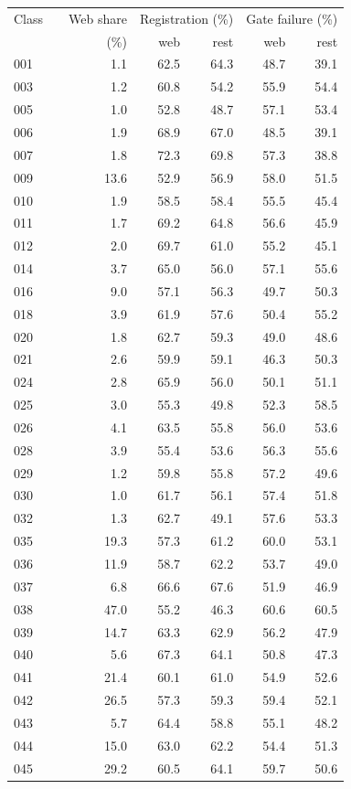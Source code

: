 \begin{tabular}{llrrrrr}
\toprule
Class & & Web share & \multicolumn{2}{c}{Registration (\%)} & \multicolumn{2}{c}{Gate failure (\%)} \\
 & & (\%) & web & rest & web & rest \\
\midrule
001 &  & 1.1 & 62.5 & 64.3 & 48.7 & 39.1 \\
003 &  & 1.2 & 60.8 & 54.2 & 55.9 & 54.4 \\
005 &  & 1.0 & 52.8 & 48.7 & 57.1 & 53.4 \\
006 &  & 1.9 & 68.9 & 67.0 & 48.5 & 39.1 \\
007 &  & 1.8 & 72.3 & 69.8 & 57.3 & 38.8 \\
009 &  & 13.6 & 52.9 & 56.9 & 58.0 & 51.5 \\
010 &  & 1.9 & 58.5 & 58.4 & 55.5 & 45.4 \\
011 &  & 1.7 & 69.2 & 64.8 & 56.6 & 45.9 \\
012 &  & 2.0 & 69.7 & 61.0 & 55.2 & 45.1 \\
014 &  & 3.7 & 65.0 & 56.0 & 57.1 & 55.6 \\
016 &  & 9.0 & 57.1 & 56.3 & 49.7 & 50.3 \\
018 &  & 3.9 & 61.9 & 57.6 & 50.4 & 55.2 \\
020 &  & 1.8 & 62.7 & 59.3 & 49.0 & 48.6 \\
021 &  & 2.6 & 59.9 & 59.1 & 46.3 & 50.3 \\
024 &  & 2.8 & 65.9 & 56.0 & 50.1 & 51.1 \\
025 &  & 3.0 & 55.3 & 49.8 & 52.3 & 58.5 \\
026 &  & 4.1 & 63.5 & 55.8 & 56.0 & 53.6 \\
028 &  & 3.9 & 55.4 & 53.6 & 56.3 & 55.6 \\
029 &  & 1.2 & 59.8 & 55.8 & 57.2 & 49.6 \\
030 &  & 1.0 & 61.7 & 56.1 & 57.4 & 51.8 \\
032 &  & 1.3 & 62.7 & 49.1 & 57.6 & 53.3 \\
035 &  & 19.3 & 57.3 & 61.2 & 60.0 & 53.1 \\
036 &  & 11.9 & 58.7 & 62.2 & 53.7 & 49.0 \\
037 &  & 6.8 & 66.6 & 67.6 & 51.9 & 46.9 \\
038 &  & 47.0 & 55.2 & 46.3 & 60.6 & 60.5 \\
039 &  & 14.7 & 63.3 & 62.9 & 56.2 & 47.9 \\
040 &  & 5.6 & 67.3 & 64.1 & 50.8 & 47.3 \\
041 &  & 21.4 & 60.1 & 61.0 & 54.9 & 52.6 \\
042 &  & 26.5 & 57.3 & 59.3 & 59.4 & 52.1 \\
043 &  & 5.7 & 64.4 & 58.8 & 55.1 & 48.2 \\
044 &  & 15.0 & 63.0 & 62.2 & 54.4 & 51.3 \\
045 &  & 29.2 & 60.5 & 64.1 & 59.7 & 50.6 \\
\bottomrule
\end{tabular}
